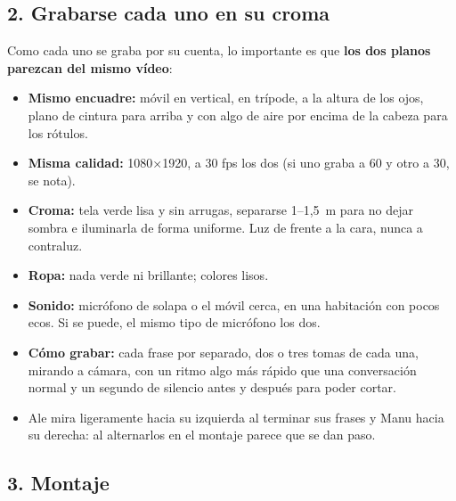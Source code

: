 \documentclass[11pt,a4paper]{article}
\begin{document}
\subsection*{2. Grabarse cada uno en su croma}

Como cada uno se graba por su cuenta, lo importante es que \textbf{los dos planos parezcan del mismo vídeo}:

\begin{itemize}[nosep]
  \item \textbf{Mismo encuadre:} móvil en vertical, en trípode, a la altura de los ojos, plano de cintura para arriba y con algo de aire por encima de la cabeza para los rótulos.
  \item \textbf{Misma calidad:} 1080×1920, a 30 fps los dos (si uno graba a 60 y otro a 30, se nota).
  \item \textbf{Croma:} tela verde lisa y sin arrugas, separarse 1--1,5~m para no dejar sombra e iluminarla de forma uniforme. Luz de frente a la cara, nunca a contraluz.
  \item \textbf{Ropa:} nada verde ni brillante; colores lisos.
  \item \textbf{Sonido:} micrófono de solapa o el móvil cerca, en una habitación con pocos ecos. Si se puede, el mismo tipo de micrófono los dos.
  \item \textbf{Cómo grabar:} cada frase por separado, dos o tres tomas de cada una, mirando a cámara, con un ritmo algo más rápido que una conversación normal y un segundo de silencio antes y después para poder cortar.
  \item Ale mira ligeramente hacia su izquierda al terminar sus frases y Manu hacia su derecha: al alternarlos en el montaje parece que se dan paso.
\end{itemize}

\subsection*{3. Montaje}
\end{document}
